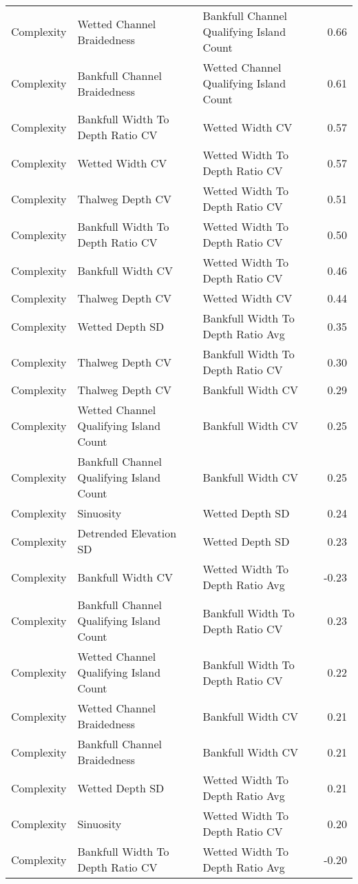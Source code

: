 \documentclass[
  12pt,
]{article}
\begin{document}
\begin{longtable}[t]{>{\raggedright\arraybackslash}p{1in}>{\raggedright\arraybackslash}p{2in}>{\raggedright\arraybackslash}p{2in}r}
Complexity & Wetted Channel Braidedness & Bankfull Channel Qualifying Island Count & 0.66\\
Complexity & Bankfull Channel Braidedness & Wetted Channel Qualifying Island Count & 0.61\\
Complexity & Bankfull Width To Depth Ratio CV & Wetted Width CV & 0.57\\
\addlinespace
Complexity & Wetted Width CV & Wetted Width To Depth Ratio CV & 0.57\\
Complexity & Thalweg Depth CV & Wetted Width To Depth Ratio CV & 0.51\\
Complexity & Bankfull Width To Depth Ratio CV & Wetted Width To Depth Ratio CV & 0.50\\
Complexity & Bankfull Width CV & Wetted Width To Depth Ratio CV & 0.46\\
Complexity & Thalweg Depth CV & Wetted Width CV & 0.44\\
\addlinespace
Complexity & Wetted Depth SD & Bankfull Width To Depth Ratio Avg & 0.35\\
Complexity & Thalweg Depth CV & Bankfull Width To Depth Ratio CV & 0.30\\
Complexity & Thalweg Depth CV & Bankfull Width CV & 0.29\\
Complexity & Wetted Channel Qualifying Island Count & Bankfull Width CV & 0.25\\
Complexity & Bankfull Channel Qualifying Island Count & Bankfull Width CV & 0.25\\
\addlinespace
Complexity & Sinuosity & Wetted Depth SD & 0.24\\
Complexity & Detrended Elevation SD & Wetted Depth SD & 0.23\\
Complexity & Bankfull Width CV & Wetted Width To Depth Ratio Avg & -0.23\\
Complexity & Bankfull Channel Qualifying Island Count & Bankfull Width To Depth Ratio CV & 0.23\\
Complexity & Wetted Channel Qualifying Island Count & Bankfull Width To Depth Ratio CV & 0.22\\
\addlinespace
Complexity & Wetted Channel Braidedness & Bankfull Width CV & 0.21\\
Complexity & Bankfull Channel Braidedness & Bankfull Width CV & 0.21\\
Complexity & Wetted Depth SD & Wetted Width To Depth Ratio Avg & 0.21\\
Complexity & Sinuosity & Wetted Width To Depth Ratio CV & 0.20\\
Complexity & Bankfull Width To Depth Ratio CV & Wetted Width To Depth Ratio Avg & -0.20\\

\end{longtable}
\end{document}
